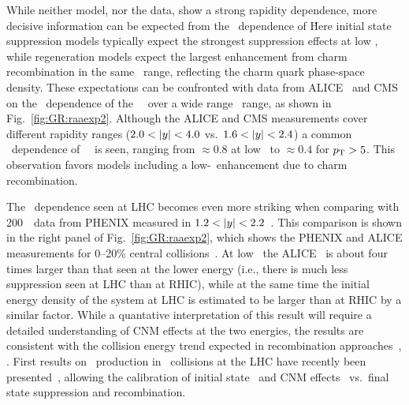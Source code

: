 While neither model, nor the data, show a strong rapidity dependence, more decisive 
information can be expected from the \pT\ dependence of \Raa\. Here initial state 
suppression models typically expect the strongest suppression effects at low \pT, while 
regeneration models expect the largest enhancement from charm recombination in the same \pT\ range,
reflecting the charm quark phase-space density.
These expectations can be confronted with data from ALICE~\cite{Abelev:2013ila} and CMS~\cite{Chatrchyan:2012np} on the \pT\ dependence of the 
\jpsi\ \Raa\ over a wide range \pT\  range, as shown in Fig.~\ref{fig:GR:raaexp2}. 
Although the ALICE and CMS measurements cover different rapidity ranges ($2.0 < |y| < 4.0$ vs.\ $ 1.6  < |y| < 2.4 $)
a common \pT\ dependence of \jpsi\ \Raa\ is seen, ranging from $\approx 0.8$ 
at low \pT\ to $\approx 0.4$ for $\mbox{$p_{\mathrm{T}}$} > 5$\GeVc.
This observation favors models including a low-\pT\ enhancement due to charm recombination.

The \pT\ dependence seen at LHC becomes even more striking when comparing with  200\GeV\ \AuAu\ 
data from PHENIX measured in $1.2 < |y| < 2.2$~\cite{Adare:2011yf}. This comparison is shown 
in the right panel of Fig.~\ref{fig:GR:raaexp2}, which shows the PHENIX and 
ALICE measurements for 0--20\% central collisions~\cite{Abelev:2013ila}.
At low \pT\ the ALICE \Raa\ is about four times larger than that seen at the lower energy (i.e.,
there is much less suppression seen at LHC than at RHIC), while
at the same time the initial energy density of the system at LHC is estimated to be larger than at
RHIC by a similar factor. While a quantative interpretation of this result will require
a detailed understanding of CNM effects at the two energies, the results are  consistent
with the collision energy trend expected in recombination 
approaches~\cite{Zhao:2007hh,Zhou:2013aea,Liu:2009nb,Zhao:2010nk}, .
First results on \jpsi\ production in \pPb\ collisions at the LHC have recently
been presented~\cite{Abelev:2013yxa,Aaij:2013zxa}, allowing
the calibration of initial state~\cite{Albacete:2014fwa} and CNM effects~\cite{Brandt:2014vva} 
vs.\ final state suppression and recombination.

